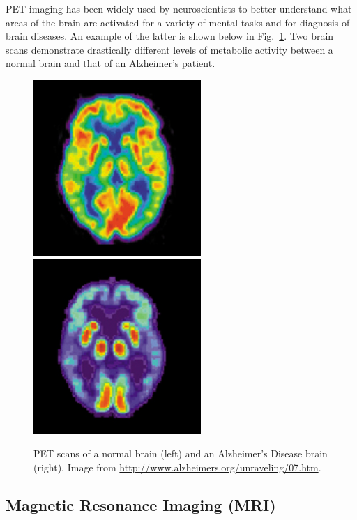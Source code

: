PET imaging has been widely used by neuroscientists to better understand what areas of the brain are activated for a variety of mental tasks and for diagnosis of brain diseases. An example of the latter is shown below in Fig.~\ref{Fig10-13}. Two brain scans demonstrate drastically different levels of metabolic activity between a normal brain and that of an Alzheimer’s patient.
\begin{figure}[!htb]
	\centering
	\includegraphics[width=2.5in]{./figures/Topic10/Fig10-13a.png}
	\includegraphics[width=2.5in]{./figures/Topic10/Fig10-13b.png}
	\caption{PET scans of a normal brain (left) and an Alzheimer’s Disease brain (right).  Image from \href{http://www.alzheimers.org/unraveling/07.htm}{http://www.alzheimers.org/unraveling/07.htm}.}
	\label{Fig10-13}
\end{figure}	 
 
\subsection{Magnetic Resonance Imaging (MRI)}

